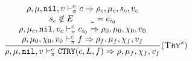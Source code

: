 \[\dfrac{\begin{array}{c}
    \rho,\mu,\texttt{nil},v \vdash_\pi^c c \Rightarrow \rho_c,\mu_c,s_c,v_c \\
    s_c \not\in E \qquad \texttt{\_} = e_{i_0} \\
    \rho,\mu_c,\texttt{nil},v_c \vdash_\pi^c c_{i_0} \Rightarrow \rho_0,\mu_0,\chi_0,v_0 \\
    \rho,\mu_0,\chi_0,v_0 \vdash_\pi^c f \Rightarrow \rho_f,\mu_f,\chi_f,v_f
\end{array}}{\rho,\mu,\texttt{nil},v \vdash_\pi^c \texttt{CTRY}(c, L, f) \Rightarrow \rho,\mu_f,\chi_f,v_f} (\textsc{Try}^s)\]

